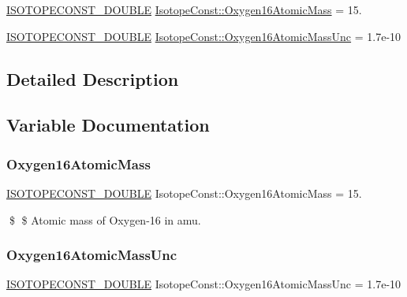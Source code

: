 \begin{DoxyCompactItemize}
\item 
\mbox{\hyperlink{group___isotope_const-_macros_ga8f45a7272ce02c0b4c65c44636ed719a}{I\+S\+O\+T\+O\+P\+E\+C\+O\+N\+S\+T\+\_\+\+D\+O\+U\+B\+LE}} \mbox{\hyperlink{group___isotope_const-_oxygen-_o16_ga187ac8c55fa0e31693f945dce46846fe}{Isotope\+Const\+::\+Oxygen16\+Atomic\+Mass}} = 15.
\item 
\mbox{\hyperlink{group___isotope_const-_macros_ga8f45a7272ce02c0b4c65c44636ed719a}{I\+S\+O\+T\+O\+P\+E\+C\+O\+N\+S\+T\+\_\+\+D\+O\+U\+B\+LE}} \mbox{\hyperlink{group___isotope_const-_oxygen-_o16_ga98b8855eada54ef090717c485be57f27}{Isotope\+Const\+::\+Oxygen16\+Atomic\+Mass\+Unc}} = 1.\+7e-\/10
\end{DoxyCompactItemize}


\subsection{Detailed Description}


\subsection{Variable Documentation}
\mbox{\label{group___isotope_const-_oxygen-_o16_ga187ac8c55fa0e31693f945dce46846fe}} 
\subsubsection{\texorpdfstring{Oxygen16\+Atomic\+Mass}{Oxygen16AtomicMass}}
{\footnotesize\ttfamily \mbox{\hyperlink{group___isotope_const-_macros_ga8f45a7272ce02c0b4c65c44636ed719a}{I\+S\+O\+T\+O\+P\+E\+C\+O\+N\+S\+T\+\_\+\+D\+O\+U\+B\+LE}} Isotope\+Const\+::\+Oxygen16\+Atomic\+Mass = 15.}

\$ \$ Atomic mass of Oxygen-\/16 in amu. \mbox{\label{group___isotope_const-_oxygen-_o16_ga98b8855eada54ef090717c485be57f27}} 
\subsubsection{\texorpdfstring{Oxygen16\+Atomic\+Mass\+Unc}{Oxygen16AtomicMassUnc}}
{\footnotesize\ttfamily \mbox{\hyperlink{group___isotope_const-_macros_ga8f45a7272ce02c0b4c65c44636ed719a}{I\+S\+O\+T\+O\+P\+E\+C\+O\+N\+S\+T\+\_\+\+D\+O\+U\+B\+LE}} Isotope\+Const\+::\+Oxygen16\+Atomic\+Mass\+Unc = 1.\+7e-\/10}

